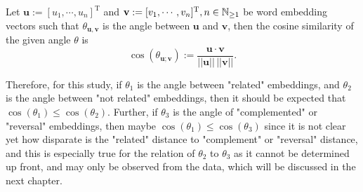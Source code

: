 \begin{defn}\label{defn:cosine_similarity}
    Let $\mathbf{u}:=[u_1,\cdots,u_n]^{\text{T}}$ and $\mathbf{v}:=[v_1,\cdots,v_n]^{\text{T}},\linebreak n\in\mathbb{N}_{\geq 1}$ be word embedding vectors such that $\theta_{\mathbf{u},\mathbf{v}}$ is the angle between $\mathbf{u}$ and $\mathbf{v}$, then the cosine similarity of the given angle $\theta$ is
    \begin{equation}
        \cos(\theta_{\mathbf{u};\mathbf{v}}):=\frac{\mathbf{u}\cdot\mathbf{v}}{||\mathbf{u}||\,||\mathbf{v}||}.
    \end{equation}
\end{defn}
Therefore, for this study, if $\theta_1$ is the angle between "related"   embeddings, and $\theta_2$ is the angle between "not related"   embeddings, then it should be expected that $\cos(\theta_1)\leq\cos(\theta_2)$. Further, if $\theta_3$ is the angle of "complemented" or "reversal"   embeddings, then maybe $\cos(\theta_1)\leq\cos(\theta_3)$ since it is not clear yet how disparate is the "related" distance to "complement" or "reversal" distance, and this is especially true for the relation of $\theta_2$ to $\theta_3$ as it cannot be determined up front, and may only be observed from the data, which will be discussed in the next chapter.
